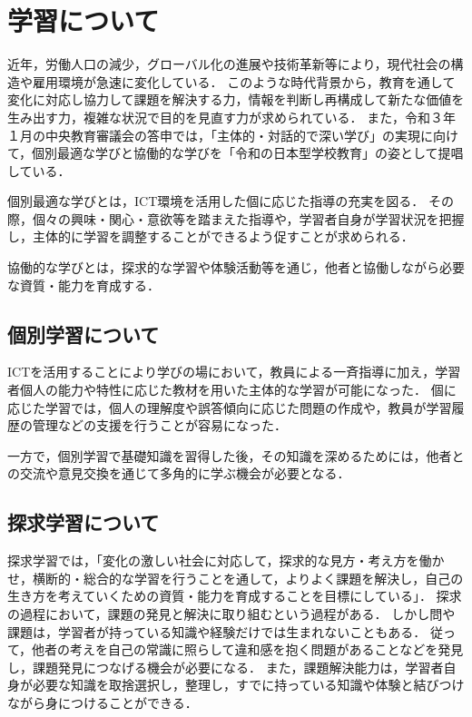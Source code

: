 \documentclass[12pt,a4j,titlepage]{ltjsarticle}
\begin{document}




\clearpage

\section{学習について}
近年，労働人口の減少，グローバル化の進展や技術革新等により，現代社会の構造や雇用環境が急速に変化している．
このような時代背景から，教育を通して変化に対応し協力して課題を解決する力，情報を判断し再構成して新たな価値を生み出す力，複雑な状況で目的を見直す力が求められている．
また，令和３年１月の中央教育審議会の答申では，「主体的・対話的で深い学び」の実現に向けて，個別最適な学びと協働的な学びを「令和の日本型学校教育」の姿として提唱している．

個別最適な学びとは，ICT環境を活用した個に応じた指導の充実を図る．
その際，個々の興味・関心・意欲等を踏まえた指導や，学習者自身が学習状況を把握し，主体的に学習を調整することができるよう促すことが求められる．

協働的な学びとは，探求的な学習や体験活動等を通じ，他者と協働しながら必要な資質・能力を育成する．

\subsection{個別学習について}
ICTを活用することにより学びの場において，教員による一斉指導に加え，学習者個人の能力や特性に応じた教材を用いた主体的な学習が可能になった．
個に応じた学習では，個人の理解度や誤答傾向に応じた問題の作成や，教員が学習履歴の管理などの支援を行うことが容易になった．

一方で，個別学習で基礎知識を習得した後，その知識を深めるためには，他者との交流や意見交換を通じて多角的に学ぶ機会が必要となる．

\subsection{探求学習について}
探求学習では，「変化の激しい社会に対応して，探求的な見方・考え方を働かせ，横断的・総合的な学習を行うことを通して，よりよく課題を解決し，自己の生き方を考えていくための資質・能力を育成することを目標にしている」．
探求の過程において，課題の発見と解決に取り組むという過程がある．
しかし問や課題は，学習者が持っている知識や経験だけでは生まれないこともある．
従って，他者の考えを自己の常識に照らして違和感を抱く問題があることなどを発見し，課題発見につなげる機会が必要になる．
また，課題解決能力は，学習者自身が必要な知識を取捨選択し，整理し，すでに持っている知識や体験と結びつけながら身につけることができる．
\end{document}
